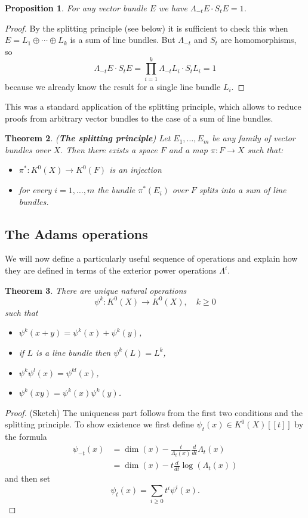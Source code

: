 \documentclass[a4paper,10pt]{article}
\theoremstyle{plain}%
\newtheorem{thm}{Theorem}
\newtheorem{prop}[thm]{Proposition}
\theoremstyle{definition}
\theoremstyle{remark}
\begin{document}
\begin{prop}
For any vector bundle $E$ we have $\Lambda_{-t}E\cdot S_t E=1$.
\end{prop}
\begin{proof}
By the splitting principle (see below) it is sufficient to check this when $E=L_1\oplus\cdots\oplus L_k$ is a sum of line bundles. But $\Lambda_{-t}$ and $S_t$ are homomorphisms, so
$$\Lambda_{-t}E\cdot S_t E=\prod_{i=1}^k\Lambda_{-t}L_i\cdot S_t L_i=1$$
because we already know the result for a single line bundle $L_i$.
\end{proof}

This was a standard application of the splitting principle, which allows to reduce proofs from arbitrary vector bundles to the case of a sum of line bundles.

\begin{thm}({\bf The splitting principle})
Let $E_1,\ldots,E_m$ be any family of vector bundles over $X$. Then there exists a space $F$ and a map $\pi: F\to X$ such that:
\begin{itemize}
\item $\pi^*: K^0(X)\to K^0(F)$ is an injection
\item for every $i=1,\ldots,m$ the bundle $\pi^*(E_i)$ over $F$ splits into a sum of line bundles.
\end{itemize}
\end{thm}



\subsection{The Adams operations}

We will now define a particularly useful sequence of operations and explain how they are defined in terms of the exterior power operations $\Lambda^i$.

\begin{thm}
There are unique natural operations
$$\psi^k: K^0(X)\to K^0(X), \quad k\geq 0$$
such that
\begin{itemize}
\item $\psi^k(x+y)=\psi^k(x)+\psi^k(y)$,
\item if $L$ is a line bundle then $\psi^k(L)=L^k$,
\item $\psi^k\psi^l(x)=\psi^{kl}(x)$,
\item $\psi^k(xy)=\psi^k(x)\psi^k(y)$.
\end{itemize}
\end{thm}
\begin{proof}(Sketch)
The uniqueness part follows from the first two conditions and the splitting principle. To show existence we first define $\psi_t(x)\in K^0(X)[[t]]$ by the formula
\begin{align*}
\psi_{-t}(x)&= \dim(x)-\frac{t}{\Lambda_t(x)}\frac{d}{dt}\Lambda_{t}(x)\\
&= \dim(x)-t\frac{d}{dt}\log(\Lambda_{t}(x))
\end{align*}
and then set 
$$\psi_t(x)=\sum_{i\geq 0}t^i\psi^i(x).$$
\end{proof}
\end{document}
